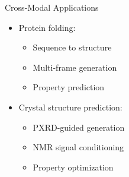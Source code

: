 \begin{frame}{Cross-Modal Applications}
    \begin{itemize}
        \item Protein folding:
        \begin{itemize}
            \item Sequence to structure
            \item Multi-frame generation
            \item Property prediction
        \end{itemize}
        \item Crystal structure prediction:
        \begin{itemize}
            \item PXRD-guided generation
            \item NMR signal conditioning
            \item Property optimization
        \end{itemize}
    \end{itemize}
\end{frame} 